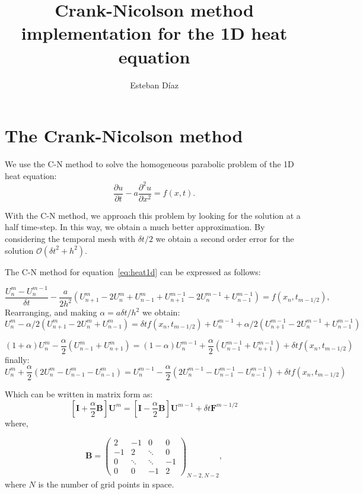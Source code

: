 \documentclass[10pt]{article}
\author{Esteban D\'{i}az}
\title{Crank-Nicolson method implementation for the 1D heat equation}{}
\def\heq{\frac{\partial u}{\partial t} -a\frac{\partial^2 u}{\partial x^2}}
\begin{document}
\maketitle

\section{The Crank-Nicolson method}
We use the C-N method to solve the homogeneous parabolic problem of the 1D
heat equation:
\begin{equation}
\heq= f(x,t).
\label{eq:heat1d}
\end{equation}

With the C-N method, we approach this problem by looking for the 
solution at a half time-step. In this way, we obtain a much better approximation.
By considering the temporal mesh with ${\delta t}/2$ we obtain a second order
error for the solution $\mathcal{O}({\delta t}^2+{h}^2)$.

The C-N method for equation~\ref{eq:heat1d} can be expressed as follows:

\[
  \frac{U_{n}^{m} -U_{n}^{m-1}}{\delta t} %
  -\frac{a}{2h^2}\left(U_{n+1}^{m}-2U_{n}^{m}+U_{n-1}^{m}%
  +U_{n+1}^{m-1}-2U_{n}^{m-1}+U_{n-1}^{m-1} \right) = f(x_n,t_{m-1/2}),
\]
Rearranging, and making $\alpha=a\delta t /h^2$ we obtain:
\[
U_{n}^{m} -\alpha/2 \left(U_{n+1}^{m}-2U_{n}^{m}+U_{n-1}^{m}\right) =%
\delta t  f(x_n,t_{m-1/2}) +U_{n}^{m-1}%
 +\alpha/2 \left(U_{n+1}^{m-1}-2U_{n}^{m-1}+U_{n-1}^{m-1} \right)
\]

\[
(1+\alpha)U^{m}_{n} -\frac{\alpha}{2}\left(U_{n-1}^{m} +U_{n+1}^m\right) =%
 (1-\alpha)U^{m-1}_{n} +\frac{\alpha}{2}\left(U_{n-1}^{m-1} +U_{n+1}^{m-1}\right)%
 +\delta t  f(x_n,t_{m-1/2})
\]
finally:
\begin{equation}
U_n^{m} +\frac{\alpha}{2}\left(2U_n^{m} -U_{n-1}^m-U_{n-1}^{m}\right) = U_n^{m-1}%
 -\frac{\alpha}{2}\left(2U_n^{m-1} -U_{n-1}^{m-1}-U_{n-1}^{m-1}\right)%
 +\delta t  f(x_n,t_{m-1/2}) 
\end{equation}

Which can be written in matrix form as:
\begin{equation}
\left[\mathbf{I} +\frac{\alpha}{2}\mathbf{B} \right] \mathbf{U}^m = \left[\mathbf{I}%
 -\frac{\alpha}{2} \mathbf{B}\right]\mathbf{U}^{m-1} +\delta t \mathbf{F}^{m-1/2}
\label{eq:CN-zero}
\end{equation}
where,

\begin{equation}
\mathbf{B}=
 \begin{pmatrix}
  2       & -1      &  0      & 0  \\
  -1      &  2      & \ddots  & 0  \\
  0       & \ddots  & \ddots  & -1 \\
  0       &  0      &  -1     &  2  
 \end{pmatrix}_{N-2,N-2},
\label{eq:B}
\end{equation}
where $N$ is the number of grid points in space.
\end{document}
